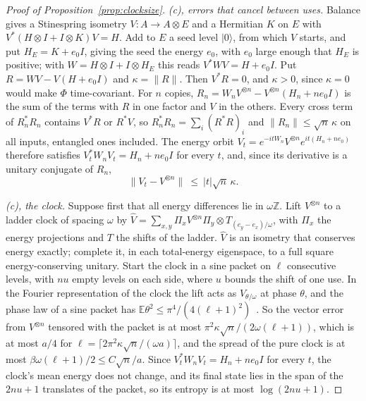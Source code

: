 \documentclass[11pt]{article}
\theoremstyle{definition}
\theoremstyle{remark}
\begin{document}
\begin{proof}[Proof of Proposition~\ref{prop:clocksize}]
\emph{(c), errors that cancel between uses.} Balance gives a Stinespring isometry $V:A\to A\otimes E$ and a Hermitian $K$ on $E$ with $V^*(H\otimes I+I\otimes K)V=H$. Add to $E$ a seed level $|0\rangle$, from which $V$ starts, and put $H_E=K+e_0I$, giving the seed the energy $e_0$, with $e_0$ large enough that $H_E$ is positive; with $W=H\otimes I+I\otimes H_E$ this reads $V^*WV=H+e_0I$. Put $R=WV-V(H+e_0I)$ and $\kappa=\|R\|$. Then $V^*R=0$, and $\kappa>0$, since $\kappa=0$ would make $\Phi$ time-covariant. For $n$ copies, $R_n=W_nV^{\otimes n}-V^{\otimes n}(H_n+ne_0I)$ is the sum of the terms with $R$ in one factor and $V$ in the others. Every cross term of $R_n^*R_n$ contains $V^*R$ or $R^*V$, so $R_n^*R_n=\sum_i(R^*R)_i$ and $\|R_n\|\le\sqrt n\,\kappa$ on all inputs, entangled ones included. The energy orbit $V_t=e^{-itW_n}V^{\otimes n}e^{it(H_n+ne_0)}$ therefore satisfies $V_t^*W_nV_t=H_n+ne_0I$ for every $t$, and, since its derivative is a unitary conjugate of $R_n$,
\[
\|V_t-V^{\otimes n}\|\ \le\ |t|\sqrt n\,\kappa.
\]

\emph{(c), the clock.} Suppose first that all energy differences lie in $\omega\mathbb Z$. Lift $V^{\otimes n}$ to a ladder clock of spacing $\omega$ by $\hat V=\sum_{x,y}\Pi_xV^{\otimes n}\Pi_y\otimes T_{(e_y-e_x)/\omega}$, with $\Pi_x$ the energy projections and $T$ the shifts of the ladder. $\hat V$ is an isometry that conserves energy exactly; complete it, in each total-energy eigenspace, to a full square energy-conserving unitary. Start the clock in a sine packet on $\ell$ consecutive levels, with $nu$ empty levels on each side, where $u$ bounds the shift of one use. In the Fourier representation of the clock the lift acts as $V_{\theta/\omega}$ at phase $\theta$, and the phase law of a sine packet has $\mathbb E\theta^2\le\pi^4/(4(\ell+1)^2)$~\cite{SaveWork}. So the vector error from $V^{\otimes n}$ tensored with the packet is at most $\pi^2\kappa\sqrt n/(2\omega(\ell+1))$, which is at most $a/4$ for $\ell=\lceil2\pi^2\kappa\sqrt n/(\omega a)\rceil$, and the spread of the pure clock is at most $\beta\omega(\ell+1)/2\le C\sqrt n/a$. Since $V_t^*W_nV_t=H_n+ne_0I$ for every $t$, the clock's mean energy does not change, and its final state lies in the span of the $2nu+1$ translates of the packet, so its entropy is at most $\log(2nu+1)$.


\end{proof}
\end{document}
